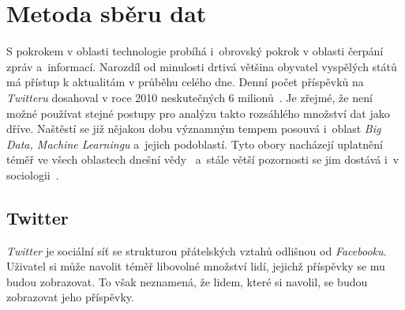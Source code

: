 \documentclass[12pt, a4paper]{article}
\numberwithin{equation}{section} 	%
\begin{document}
\newpage
\section{Metoda sběru dat}
\noindent S pokrokem v oblasti technologie probíhá i~obrovský pokrok v oblasti čerpání zpráv a~informací. Narozdíl od minulosti drtivá většina obyvatel vyspělých států má přístup k aktualitám v průběhu celého dne. Denní počet příspěvků na \textit{Twitteru} dosahoval v roce 2010 neskutečných 6 milionů~\cite{Mathioudakis2010}. Je zřejmé, že není možné používat stejné postupy pro analýzu takto rozsáhlého množství dat jako dříve. Naštěstí se již nějakou dobu významným tempem posouvá i~oblast \textit{Big Data, Machine Learningu} a~jejich podoblastí. Tyto obory nacházejí uplatnění téměř ve všech oblastech dnešní vědy~\cite{Huberman2012-2-15} a~stále větší pozornosti se jim dostává i~v sociologii~\cite{Tinati2014, McFarland2016, Shah2015-04-09}.


\subsection{Twitter}
\noindent\textit{Twitter} je sociální síť se strukturou přátelských vztahů odlišnou od \textit{Facebooku}. Uživatel si může navolit téměř libovolné množství lidí, jejichž příspěvky se mu budou zobrazovat. To však neznamená, že lidem, které si navolil, se budou zobrazovat jeho příspěvky.
\end{document}
